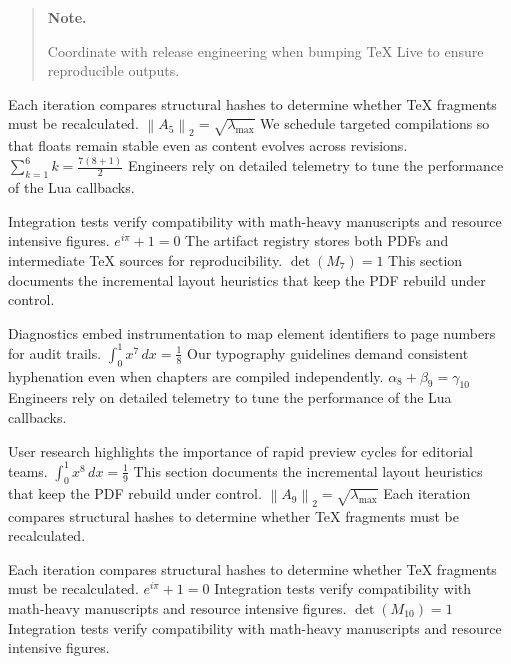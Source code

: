 \documentclass[12pt,a4paper,twocolumn]{article}
\newcommand{\paraid}[1]{\par\noindent\hypertarget{#1}{\ignorespaces}}
\begin{document}
\begin{quote}
\hypertarget{sec4-note}{\textbf{Note.}} 
            Coordinate with release engineering when bumping TeX Live to ensure reproducible
            outputs.
    
\end{quote}

\paraid{sec4-p1}Each iteration compares structural hashes to determine whether TeX fragments must be recalculated. $\left\|A_{5}\right\|_{2} = \sqrt{\lambda_{\max}}$ We schedule targeted compilations so that floats remain stable even as content evolves across revisions. $\sum_{k=1}^{6} k = \frac{7(8+1)}{2}$ Engineers rely on detailed telemetry to tune the performance of the Lua callbacks.
\par

\paraid{sec4-p2}Integration tests verify compatibility with math-heavy manuscripts and resource intensive figures. $e^{i\pi} + 1 = 0$ The artifact registry stores both PDFs and intermediate TeX sources for reproducibility. $\det(M_{7}) = 1$ This section documents the incremental layout heuristics that keep the PDF rebuild under control.
\par

\paraid{sec4-p3}Diagnostics embed instrumentation to map element identifiers to page numbers for audit trails. $\int_{0}^{1} x^{7} \, dx = \frac{1}{8}$ Our typography guidelines demand consistent hyphenation even when chapters are compiled independently. $\alpha_{8} + \beta_{9} = \gamma_{10}$ Engineers rely on detailed telemetry to tune the performance of the Lua callbacks.
\par

\paraid{sec4-p4}User research highlights the importance of rapid preview cycles for editorial teams. $\int_{0}^{1} x^{8} \, dx = \frac{1}{9}$ This section documents the incremental layout heuristics that keep the PDF rebuild under control. $\left\|A_{9}\right\|_{2} = \sqrt{\lambda_{\max}}$ Each iteration compares structural hashes to determine whether TeX fragments must be recalculated.
\par

\paraid{sec4-p5}Each iteration compares structural hashes to determine whether TeX fragments must be recalculated. $e^{i\pi} + 1 = 0$ Integration tests verify compatibility with math-heavy manuscripts and resource intensive figures. $\det(M_{10}) = 1$ Integration tests verify compatibility with math-heavy manuscripts and resource intensive figures.
\par
\end{document}
